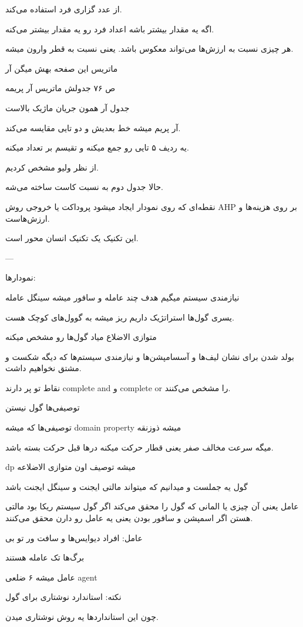 از عدد گزاری فرد استفاده می‌کند.

اگه یه مقدار بیشتر باشه اعداد فرد رو یه مقدار بیشتر می‌کنه.

هر چیزی نسبت به ارزش‌ها می‌تواند معکوس باشد. یعنی نسبت به قطر وارون میشه.

ماتریس این صفحه بهش میگن آر

ص ۷۶ جدولش ماتریس آر پریمه

جدول آر همون جریان ماژیک بالاست

آر پریم میشه خط بعدیش و دو تایی مقایسه می‌کند.

یه ردیف ۵ تایی رو جمع میکنه و تقیسم بر تعداد میکنه.

از نظر ولیو مشخص کردیم.

حالا جدول دوم به نسبت کاست ساخته می‌شه.

نقطه‌ای که روی نمودار ایجاد میشود پروداکت یا خروجی روش AHP بر روی هزینه‌ها و
ارزش‌هاست.

این تکنیک یک تکنیک انسان محور است.

---

نمودار‌ها:

نیازمندی سیستم میگیم هدف چند عامله
و سافور میشه سینگل عامله

یسری گول‌ها استراتژیک داریم ریز میشه به گوول‌های کوچک هست.

متوازی الاضلاع میاد گول‌ها رو مشخص میکنه

بولد شدن برای نشان لیف‌ها و آسسامپشن‌ها و نیازمندی سیستم‌ها که دیگه شکست و مشتق
نخواهیم داشت.

نقاط تو پر دارند complete and و complete or را مشخص می‌کنند.

توصیفی‌ها گول نیستن

توصیفی‌ها که میشه domain property میشه ذوزنقه

میگه سرعت مخالف صفر یعنی قطار حرکت میکنه در‌ها قبل حرکت بسته باشد.

dp میشه توصیف اون متوازی الاضلاعه

گول یه جملست و میدانیم که میتواند مالتی ایجنت و سینگل ایجنت باشد

عامل یعنی آن چیزی یا المانی که گول را محقق می‌کند
اگر گول سیستم ریکا بود مالتی هستن
اگر اسمپشن و سافور بودن یعنی یه عامل رو دارن محقق می‌کنند.

عامل: افراد دیوایس‌ها و سافت ور تو بی

برگ‌ها تک عامله هستند 

عامل میشه ۶ ضلعی agent

نکته: استاندارد نوشتاری برای گول

چون این استاندارد‌ها یه روش نوشتاری میدن.

